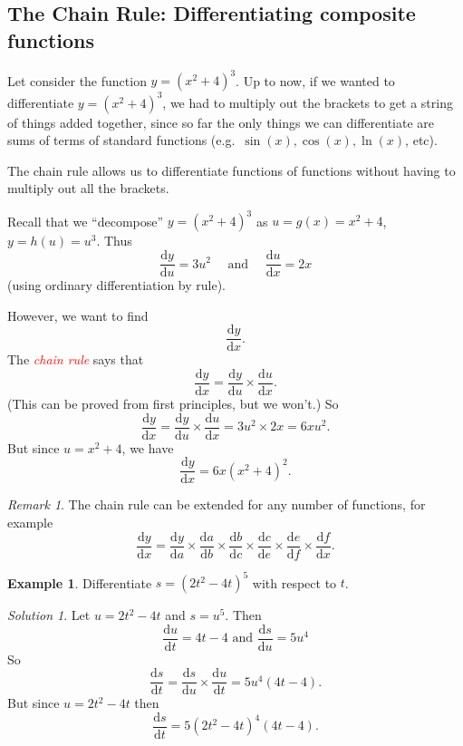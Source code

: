 \documentclass[
  11pt,
  oneside]{book}
\newcommand{\slide}{}
\theoremstyle{definition}
\theoremstyle{definition}
\newtheorem{example}{Example}[chapter]
\theoremstyle{definition}
\theoremstyle{definition}
\theoremstyle{remark}
\newtheorem*{remark}{Remark}
\newtheorem*{solution}{Solution}
\begin{document}
\subsection{The Chain Rule: Differentiating composite functions}\label{the-chain-rule-differentiating-composite-functions}

Let consider the function \(y = (x^2+ 4)^3\). Up to now, if we wanted to differentiate \(y = (x^2 + 4)^3\), we had to multiply out the brackets to get a string of things added together, since so far the only things we can differentiate are sums of terms of standard functions (e.g.~\(\sin(x), \cos(x), \ln(x)\), etc).

The chain rule allows us to differentiate functions of functions without having to multiply out all the brackets.

\slide

Recall that we ``decompose'' \(y=(x^2+4)^3\) as \(u = g(x) = x^2+4\), \(y = h(u) = u^3\).
Thus
\[
\frac{\mathrm{d} y}{\mathrm{d} u} = 3u^2 \quad\text{ and }\quad
\frac{\mathrm{d} u}{\mathrm{d} x} = 2x
\]
(using ordinary differentiation by rule).

However, we want to find
\[
\frac{\mathrm{d} y}{\mathrm{d} x}.
\]
The \textcolor{red}{\em chain rule} says that
\[
\frac{\mathrm{d} y}{\mathrm{d} x} = \frac{\mathrm{d} y}{\mathrm{d} u}\times \frac{\mathrm{d} u}{\mathrm{d} x}.
\]
(This can be proved from first principles, but we won't.)
So
\[
\frac{\mathrm{d} y}{\mathrm{d} x} = \frac{\mathrm{d} y}{\mathrm{d} u}\times \frac{\mathrm{d} u}{\mathrm{d} x} = 3u^2\times 2x = 6xu^2.
\]
But since \(u = x^2+4\), we have
\[
\frac{\mathrm{d} y}{\mathrm{d} x} = 6x(x^2 +4)^2.
\]

\begin{remark}
The chain rule can be extended for any number of functions, for example
\[
\frac{\mathrm{d} y}{\mathrm{d} x} = \frac{\mathrm{d} y}{\mathrm{d} a}\times \frac{\mathrm{d} a}{\mathrm{d} b}\times \frac{\mathrm{d} b}{\mathrm{d} c}\times \frac{\mathrm{d} c}{\mathrm{d} e}\times\frac{\mathrm{d} e}{\mathrm{d} f}\times\frac{\mathrm{d} f}{\mathrm{d} x}.
\]
\end{remark}

\slide

\begin{example}
Differentiate \(s = (2t^2- 4t)^5\) with respect to \(t\).
\end{example}

\begin{solution}
Let \(u = 2t^2-4t\) and \(s = u^5\). Then
\[
\frac{\mathrm{d} u}{\mathrm{d} t} = 4t-4\text{ and }\frac{\mathrm{d} s}{\mathrm{d} u} = 5u^4
\]
So
\[
\frac{\mathrm{d} s}{\mathrm{d} t} = \frac{\mathrm{d} s}{\mathrm{d} u}\times\frac{\mathrm{d} u}{\mathrm{d} t} = 5u^4(4t-4).
\]
But since \(u = 2t^2-4t\) then
\[
\frac{\mathrm{d} s}{\mathrm{d} t} = 5(2t^2-4t)^4(4t-4).
\]
\end{solution}
\end{document}
